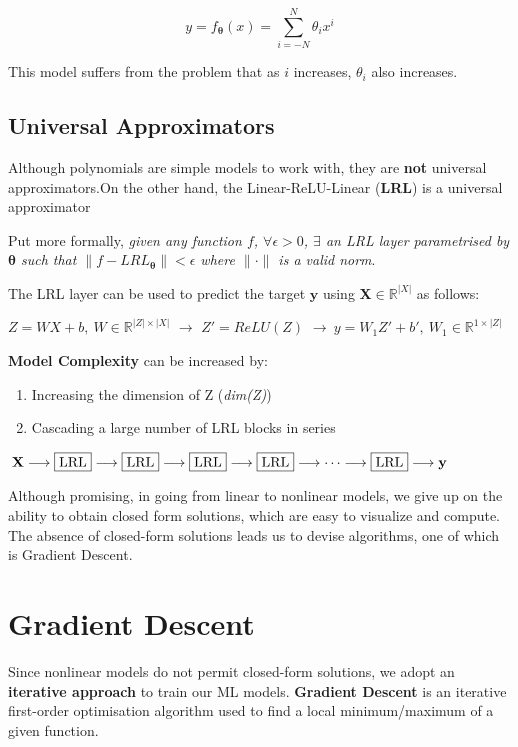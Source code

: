 \documentclass[11pt, twosides]{article}
\begin{document}
\begin{equation}
    y = f_{\mathbf{\theta}}\left(x\right)= \sum_{i = -N}^{N}\theta_{i}x^{i}
\end{equation}

This model suffers from the problem that as $i$ increases, $\theta_{i}$ also increases.

\subsection{Universal Approximators}
Although polynomials are simple models to work with, they are \textbf{not} universal approximators.On the other hand, the Linear-ReLU-Linear (\textbf{LRL}) is a universal approximator 

Put more formally, \emph{given any function $f$, $\forall \epsilon > 0$, $\exists$ an LRL layer parametrised by $\mathbf{\theta}$ such that $\|f - LRL_{\mathbf{\theta}}\| < \epsilon$ where $\|\cdot\|$ is a valid norm}.

The LRL layer can be used to predict the target $\textbf{y}$ using \textbf{X}$\in \mathbb{R}^{|X|}$ as follows:

$Z = WX+b ,\: W\in\mathbb{R}^{|Z|\times|X|}$ $\longrightarrow$ \:$Z' = ReLU(Z)$  $\longrightarrow\: y = W_1Z'+b',\: W_1\in\mathbb{R}^{1\times|Z|}$

\textbf{Model Complexity} can be increased by:
\begin{enumerate}
    \item Increasing the dimension of Z (\emph{dim(Z)})
    \item Cascading a large number of LRL blocks in series
\end{enumerate}

\begin{center}
    $\:\textbf{X}\longrightarrow\framebox{LRL}\longrightarrow\framebox{LRL}\longrightarrow\framebox{LRL}\longrightarrow\framebox{LRL}\longrightarrow\cdots\longrightarrow\framebox{LRL}\longrightarrow\textbf{y}$
\end{center}

Although promising, in going from linear to nonlinear models, we give up on the ability to obtain closed form solutions, which are easy to visualize and compute. The absence of closed-form solutions leads us to devise algorithms, one of which is Gradient Descent.

\section{Gradient Descent}
Since nonlinear models do not permit closed-form solutions, we adopt an \textbf{iterative approach} to train our ML models. \textbf{Gradient Descent} is an iterative first-order optimisation algorithm used to find a local minimum/maximum of a given function.
\end{document}
